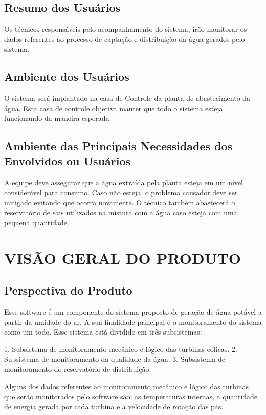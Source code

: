   \subsection*{Resumo dos Usuários}
  Os técnicos responsáveis pelo acompanhamento do sistema, irão monitorar os dados referentes ao  processo de captação e 
  distribuição da água gerados pelo sistema.
  
  \subsection*{Ambiente dos Usuários}
  O sistema será implantado na casa  de Controle da planta de abastecimento da água. Esta casa de controle objetiva manter que 
  todo o sistema esteja funcionando da maneira esperada.
  
  \subsection*{Ambiente das Principais Necessidades dos Envolvidos ou Usuários}
  A equipe deve assegurar que a água extraída pela planta esteja em um nível considerável para consumo. Caso não esteja, o 
  problema causador deve ser mitigado evitando que ocorra novamente. O técnico também abastecerá o reservatório de sais 
  utilizados na mistura com a água caso esteja com uma pequena quantidade.
  
  \section*{VISÃO GERAL DO PRODUTO}
  
  \subsection*{Perspectiva do Produto}
  Esse software é um componente do sistema proposto de geração de água potável a partir da umidade do ar. A sua finalidade 
  principal é o monitoramento do sistema como um todo. Esse sistema está dividido em três subsistemas: 
  
  1. Subsistema de monitoramento mecânico e lógico das turbinas eólicas.
  2. Subsistema de monitoramento da qualidade da água.
  3. Subsistema de monitoramento do reservatório de distribuição.
  
  Alguns dos dados referentes ao monitoramento mecânico e lógico das turbinas que serão monitorados pelo software são: as temperaturas 
  internas, a quantidade de energia gerada por cada turbina e a velocidade de rotação das pás. 
  
